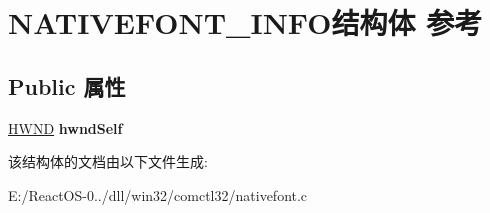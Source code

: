\hypertarget{struct_n_a_t_i_v_e_f_o_n_t___i_n_f_o}{}\section{N\+A\+T\+I\+V\+E\+F\+O\+N\+T\+\_\+\+I\+N\+F\+O结构体 参考}
\label{struct_n_a_t_i_v_e_f_o_n_t___i_n_f_o}
\subsection*{Public 属性}
\begin{DoxyCompactItemize}
\item 
\mbox{\label{struct_n_a_t_i_v_e_f_o_n_t___i_n_f_o_a6304f6b22d8c84792de05061d34f8e4b}} 
\hyperlink{interfacevoid}{H\+W\+ND} {\bfseries hwnd\+Self}
\end{DoxyCompactItemize}


该结构体的文档由以下文件生成\+:\begin{DoxyCompactItemize}
\item 
E\+:/\+React\+O\+S-\/0../dll/win32/comctl32/nativefont.\+c\end{DoxyCompactItemize}
